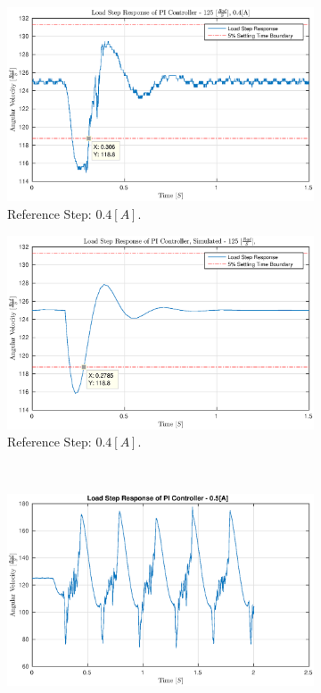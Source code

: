 \begin{figure}
	\begin{subfigure}[t]{.49\linewidth}
		\centering
		\includegraphics[width=\textwidth]{graphics/load_real}
		\caption{Reference Step: $0.4 [A]$.}
		\label{fig:loadstep04real}
	\end{subfigure}
	\begin{subfigure}[t]{.49\linewidth}
		\includegraphics[width=\textwidth]{graphics/load_simulated}
		\caption{Reference Step: $0.4 [A]$.}
		\label{fig:loadstep04simulated}
	\end{subfigure}\\
	\centering
	\begin{subfigure}[t]{.49\linewidth}
		\includegraphics[width=\textwidth]{graphics/load_unstable}

\end{subfigure}
\end{figure}

